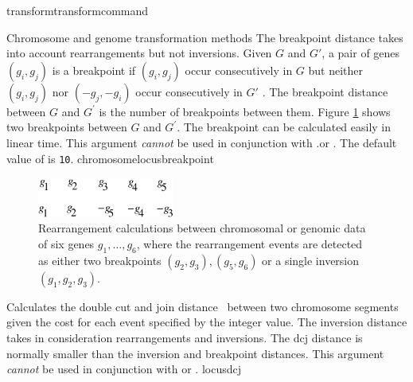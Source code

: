 \begin{command}{transform}{transformcommand}
\begin{arguments}
\begin{argumentgroup}{Chromosome and genome transformation methods}
{                The breakpoint distance takes into account rearrangements but not inversions.
                Given $G$ and $G'$, a pair of genes $(g_i, g_j)$ is a breakpoint if $(g_i, g_j)$ occur 
                consecutively in $G$ but neither $(g_i, g_j)$ nor $(-g_j, -g_i)$ occur
                consecutively in $G'$  \cite{sankoffandblanchette1998}.  The breakpoint distance between $G$
                and $G^\prime$ is the number of breakpoints between them.  Figure \ref{fig:distance} 
                shows two breakpoints between $G$ and $G^\prime$. The breakpoint can be calculated 
                easily in linear time.  This argument \emph{cannot} be used in
                conjunction with .or . The default
                value of  is \texttt{10}.} 
                {chromosomelocusbreakpoint} 
        
            \begin{figure}[!htbp]
                \begin{center}
                    \includegraphics[width=0.4\textwidth]{doc/figures/breakpointDis.pdf}
                \end{center}
                \caption{Rearrangement calculations between chromosomal or genomic 
                data of six genes $g_1, \ldots, g_6$, where the rearrangement events 
                are detected as either two breakpoints $(g_2, g_3), (g_5, g_6)$
                or a single inversion $(g_1, g_2, g_3)$.}
                \label{fig:distance}
            \end{figure}
    
            \begin{description}                 
                        
                    {Calculates the double cut and join
                    distance~\cite{yancopoulosetal2005}
                    between two chromosome segments given the cost for each
                    event specified by the integer value. The inversion distance
                    takes in consideration rearrangements and
                    inversions. The dcj distance is normally smaller than
                    the inversion and breakpoint distances.
                    This argument \emph{cannot} be used in conjunction with
                     or
                    .} 
                    {locusdcj}
                        

\end{description}
\end{argumentgroup}
\end{arguments}
\end{command}
